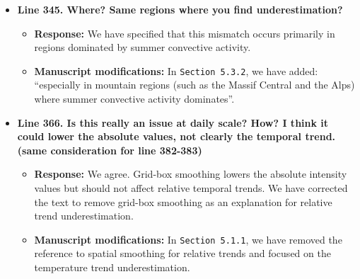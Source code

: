 \documentclass[
  letterpaper,
  DIV=11,
  numbers=noendperiod]{scrartcl}
\providecommand{\tightlist}{%
  \setlength{\itemsep}{0pt}\setlength{\parskip}{0pt}}\usepackage{longtable,booktabs,array}
\begin{document}
\begin{itemize}
  \begin{itemize}
  \tightlist
  \item
    \textbf{Response:} We have added July and October to the list of
    months with very low spatial correlations.
  \item
    \textbf{Manuscript modifications:} In \texttt{Section\ 4.2.2}, we
    have updated the text to: ``spatial correlations are almost null in
    March, May, July, September, and October''.
  \end{itemize}
\item
  \textbf{Line 345. Where? Same regions where you find underestimation?}

  \begin{itemize}
  \tightlist
  \item
    \textbf{Response:} We have specified that this mismatch occurs
    primarily in regions dominated by summer convective activity.
  \item
    \textbf{Manuscript modifications:} In \texttt{Section\ 5.3.2}, we
    have added: ``especially in mountain regions (such as the Massif
    Central and the Alps) where summer convective activity dominates''.
  \end{itemize}
\item
  \textbf{Line 366. Is this really an issue at daily scale? How? I think
  it could lower the absolute values, not clearly the temporal trend.
  (same consideration for line 382-383)}

  \begin{itemize}
  \tightlist
  \item
    \textbf{Response:} We agree. Grid-box smoothing lowers the absolute
    intensity values but should not affect relative temporal trends. We
    have corrected the text to remove grid-box smoothing as an
    explanation for relative trend underestimation.
  \item
    \textbf{Manuscript modifications:} In \texttt{Section\ 5.1.1}, we
    have removed the reference to spatial smoothing for relative trends
    and focused on the temperature trend underestimation.
  \end{itemize}
\end{itemize}
\end{document}
